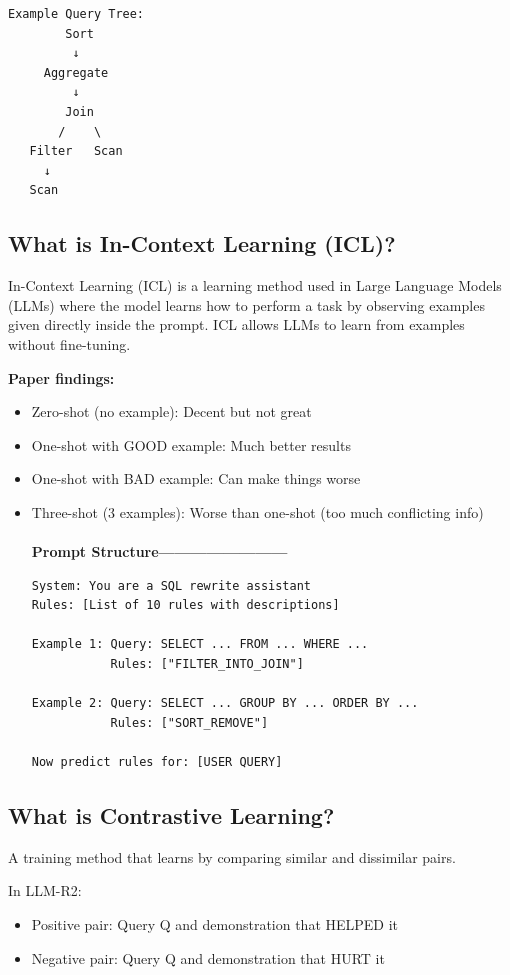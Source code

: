 \documentclass[12pt,a4paper]{article}
\begin{document}
\begin{verbatim}
Example Query Tree:
        Sort
         ↓
     Aggregate
         ↓
        Join
       /    \
   Filter   Scan
     ↓
   Scan
\end{verbatim}

\subsection{What is In-Context Learning (ICL)?}
In-Context Learning (ICL) is a learning method used in Large Language Models (LLMs) where the model learns how to perform a task by observing examples given directly inside the prompt. ICL allows LLMs to learn from examples without fine-tuning.

\textbf{Paper findings:}
\begin{itemize}
    \item Zero-shot (no example): Decent but not great
    \item One-shot with GOOD example: Much better results
    \item One-shot with BAD example: Can make things worse
    \item Three-shot (3 examples): Worse than one-shot (too much conflicting info)\\ \\
\textbf{Prompt Structure------------------------ }
\begin{verbatim}
System: You are a SQL rewrite assistant
Rules: [List of 10 rules with descriptions]

Example 1: Query: SELECT ... FROM ... WHERE ...
           Rules: ["FILTER_INTO_JOIN"]

Example 2: Query: SELECT ... GROUP BY ... ORDER BY ...
           Rules: ["SORT_REMOVE"]

Now predict rules for: [USER QUERY]
\end{verbatim}
\end{itemize}

\subsection{What is Contrastive Learning?}
A training method that learns by comparing similar and dissimilar pairs.

In LLM-R2:
\begin{itemize}
    \item Positive pair: Query Q and demonstration that HELPED it
    \item Negative pair: Query Q and demonstration that HURT it
\end{itemize}
\end{document}
